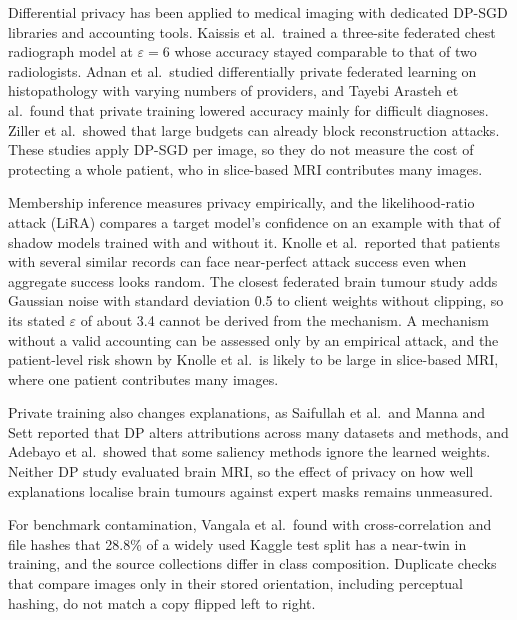 \documentclass[preprint,12pt]{elsarticle}
\begin{document}
Differential privacy has been applied to medical imaging with dedicated DP-SGD libraries and accounting
tools.\cite{ziller2021,mironov2017,yousefpour2021} Kaissis et al.\ trained a three-site federated chest radiograph
model at $\varepsilon=6$ whose accuracy stayed comparable to that of two radiologists.\cite{kaissis2021} Adnan et
al.\ studied differentially private federated learning on histopathology with varying numbers of
providers,\cite{adnan2022} and Tayebi Arasteh et al.\ found that private training lowered accuracy mainly for
difficult diagnoses.\cite{tayebi2024} Ziller et al.\ showed that large budgets can already block reconstruction
attacks.\cite{ziller2024} These studies apply DP-SGD per image, so they do not measure the cost of protecting a whole
patient, who in slice-based MRI contributes many images.

Membership inference measures privacy empirically, and the likelihood-ratio attack (LiRA) compares a target model's
confidence on an example with that of shadow models trained with and without it.\cite{carlini2022} Knolle et al.\
reported that patients with several similar records can face near-perfect attack success even when aggregate success
looks random.\cite{knolle2026} The closest federated brain tumour study adds Gaussian noise with standard deviation
0.5 to client weights without clipping, so its stated $\varepsilon$ of about 3.4 cannot be derived from the
mechanism.\cite{gupta2026} A mechanism without a valid accounting can be assessed only by an empirical attack, and
the patient-level risk shown by Knolle et al.\ is likely to be large in slice-based MRI, where one patient contributes
many images.

Private training also changes explanations, as Saifullah et al.\ and Manna and Sett reported that DP alters
attributions across many datasets and methods,\cite{saifullah2024,manna2024} and Adebayo et al.\ showed that some saliency methods
ignore the learned weights.\cite{adebayo2018} Neither DP study evaluated brain MRI, so the effect of privacy on how well
explanations localise brain tumours against expert masks remains unmeasured.

For benchmark contamination, Vangala et al.\ found with cross-correlation and file hashes that 28.8\% of a
widely used Kaggle test split has a near-twin in training,\cite{vangala2026} and the source collections differ in
class composition.\cite{chengdata,sartajdata,br35hdata} Duplicate checks that compare images only in their stored
orientation, including perceptual hashing, do not match a copy flipped left to right.
\end{document}

